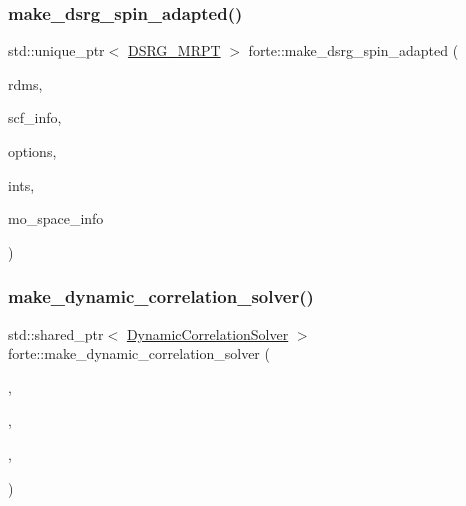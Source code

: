 \mbox{\label{namespaceforte_a85c9c19919ccd4684ab6fd6eaec52d90}} 
\subsubsection{\texorpdfstring{make\+\_\+dsrg\+\_\+spin\+\_\+adapted()}{make\_dsrg\_spin\_adapted()}}
{\footnotesize\ttfamily std\+::unique\+\_\+ptr$<$ \mbox{\hyperlink{classforte_1_1_d_s_r_g___m_r_p_t}{D\+S\+R\+G\+\_\+\+M\+R\+PT}} $>$ forte\+::make\+\_\+dsrg\+\_\+spin\+\_\+adapted (\begin{DoxyParamCaption}\item[{\mbox{\hyperlink{classforte_1_1_r_d_ms}{R\+D\+Ms}}}]{rdms,  }\item[{std\+::shared\+\_\+ptr$<$ \mbox{\hyperlink{classforte_1_1_s_c_f_info}{S\+C\+F\+Info}} $>$}]{scf\+\_\+info,  }\item[{std\+::shared\+\_\+ptr$<$ \mbox{\hyperlink{classforte_1_1_forte_options}{Forte\+Options}} $>$}]{options,  }\item[{std\+::shared\+\_\+ptr$<$ \mbox{\hyperlink{classforte_1_1_forte_integrals}{Forte\+Integrals}} $>$}]{ints,  }\item[{std\+::shared\+\_\+ptr$<$ \mbox{\hyperlink{classforte_1_1_m_o_space_info}{M\+O\+Space\+Info}} $>$}]{mo\+\_\+space\+\_\+info }\end{DoxyParamCaption})}

\mbox{\label{namespaceforte_a63b91e27acecb2c086aa8089c7a00136}} 
\subsubsection{\texorpdfstring{make\+\_\+dynamic\+\_\+correlation\+\_\+solver()}{make\_dynamic\_correlation\_solver()}}
{\footnotesize\ttfamily std\+::shared\+\_\+ptr$<$ \mbox{\hyperlink{classforte_1_1_dynamic_correlation_solver}{Dynamic\+Correlation\+Solver}} $>$ forte\+::make\+\_\+dynamic\+\_\+correlation\+\_\+solver (\begin{DoxyParamCaption}\item[{const std\+::string \&}]{,  }\item[{std\+::shared\+\_\+ptr$<$ \mbox{\hyperlink{classforte_1_1_forte_options}{Forte\+Options}} $>$}]{,  }\item[{std\+::shared\+\_\+ptr$<$ \mbox{\hyperlink{classforte_1_1_forte_integrals}{Forte\+Integrals}} $>$}]{,  }\item[{std\+::shared\+\_\+ptr$<$ \mbox{\hyperlink{classforte_1_1_m_o_space_info}{M\+O\+Space\+Info}} $>$}]{ }\end{DoxyParamCaption})}

